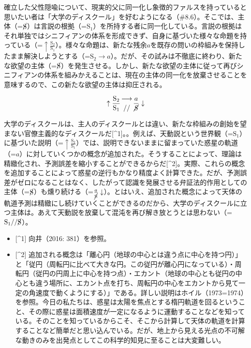 確立した父性隠喩について、現実的父に同一化し象徴的ファルスを持っていると思いたい者は「大学のディスクール」を好むようになる（\#8.6）。そこでは、主体（=\(\cancel{\textrm{S}}\)）は言説の根拠（=\(\textrm{S}_1\)）を所持する者に同一化している。言説の根拠はそれ単独ではシニフィアンの体系を形成できず、自身に基づいた様々な命題を持っている（=\(\uparrow\frac{\textrm{S}_2}{\textrm{S}_1}\)）。様々な命題は、新たな残余\(a\)を既存の問いの枠組みを保持したまま解決しようとする（=\(\textrm{S}_2\rightarrow a\)）。だが、その試みは不徹底に終わり、新たな欲望の主体（=\(\cancel{\textrm{S}}\)）を発生させる。しかし、新たな欲望の主体に従って再びシニフィアンの体系を組みかえることは、現在の主体の同一化を放棄させることを意味するので、この新たな欲望の主体は抑圧される。

\[
\uparrow\frac{\mathrm{S_2}}{\mathrm{S_1}}\genfrac{}{}{0pt}{}{\longrightarrow}{//}\frac{a}{\mathrm{\cancel{S}}}\downarrow
\]

大学のディスクールは、主人のディスクールとは違い、新たな枠組みの創始を望まない官僚主義的なディスクールだ{[}\^{}1{]}。。例えば、天動説という世界観（=\(\textrm{S}_1\)）に基づいた説明（=\(\uparrow\frac{\textrm{S}_2}{\textrm{S}_1}\)）では、説明できないままに留まっていた惑星の軌道（=\(a\)）に対していくつかの概念が追加された。そうすることによって、理論は精緻化され、予測誤差を縮小することができるからだ{[}\^{}2{]}。実際、これらの概念を追加することによって惑星の逆行もかなり精度よく計算できた。だが、予測誤差がゼロになることはなく、したがって認識を発展させる弁証法的作用としての主体（=\(\cancel{\textrm{S}}\)）も燻り続ける（=\(\frac{a}{\cancel{\textrm{S}}}\downarrow\)）。とはいえ、追加された概念によって天体の軌道予測は精緻にし続けていくことができるのだから、大学のディスクールに立つ主体は。あえて天動説を放棄して混沌を再び解き放とうとは思わない（=\(\textrm{S}_1//\cancel{\textrm{S}}\)）。

\begin{itemize}
\tightlist
\item
  {[}\^{}1{]} 向井（2016: 381）を参照。
\item
  {[}\^{}2{]}
  追加される概念は「離心円（地球の中心とは違う点に中心を持つ円）」と「従円（周転円に比べて大きな円。この従円が離心円になっている）・周転円（従円の円周上に中心を持つ点）・エカント（地球の中心とも従円の中心とも違う場所に、エカント点を打ち、周転円の中心をエカントから見て一定の角速度で動くようにする）」である。詳しい説明はホイル（1973=1974）を参照。今日の私たちは、惑星は太陽を焦点とする楕円軌道を回るということ、その際に惑星は面積速度が一定になるように運動することなどを知っている。そのことを知っているからこそ、そこから計算して天体の軌道を計算することなど簡単だと思い込んでいる。だが、地上から見える光点の不可解な動きのみを出発点としてこの科学的知見に至ることは大変難しい。
\end{itemize}

